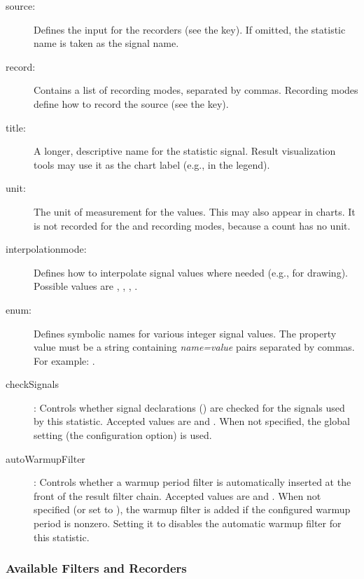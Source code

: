 \begin{description}
  \item[source:] Defines the input for the recorders (see the  key).
     If omitted, the statistic name is taken as the signal name.
  \item[record:] Contains a list of recording modes, separated by commas.
     Recording modes define how to record the source (see the  key).
  \item[title:] A longer, descriptive name for the statistic signal. Result
      visualization tools may use it as the chart label (e.g., in the legend).
  \item[unit:] The unit of measurement for the values. This may also appear in charts.
      It is not recorded for the  and  recording modes,
      because a count has no unit.
  \item[interpolationmode:] Defines how to interpolate signal values where
      needed (e.g., for drawing). Possible values are ,
      , , .
  \item[enum:] Defines symbolic names for various integer signal values.
      The property value must be a string containing \textit{name=value} pairs
      separated by commas. For example: .
  \item[checkSignals]: Controls whether signal declarations ()
      are checked for the signals used by this statistic. Accepted values are
       and . When not specified, the global setting
      (the  configuration option) is used.
  \item[autoWarmupFilter]: Controls whether a warmup period filter is
      automatically inserted at the front of the result filter chain.
      Accepted values are  and . When not specified
      (or set to ), the warmup filter is added if the configured
      warmup period is nonzero. Setting it to  disables the
      automatic warmup filter for this statistic.
\end{description}


\subsubsection{Available Filters and Recorders}
\label{sec:simple-modules:available-result-filters-and-recorders}

